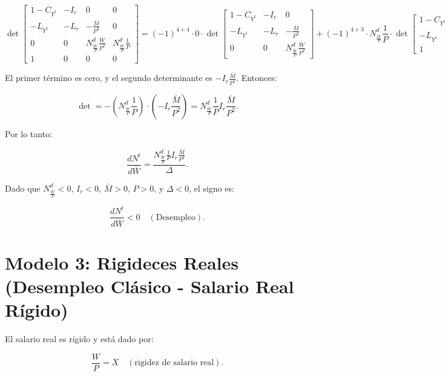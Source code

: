 \documentclass[
  doc,
  floatsintext,
  longtable,
  a4paper,
  nolmodern,
  notxfonts,
  notimes,
  colorlinks=true,linkcolor=blue,citecolor=blue,urlcolor=blue]{apa7}
\begin{document}
\begin{enumerate}
  \[
  \det \begin{bmatrix}
  1 - C_{Y^t} & -I_r & 0 & 0 \\
  -L_{Y^t} & -L_r & -\frac{\bar{M}}{P^2} & 0 \\
  0 & 0 & N^d_{\frac{\bar{W}}{P}} \frac{\bar{W}}{P^2} & N^d_{\frac{\bar{W}}{P}} \frac{1}{P} \\
  1 & 0 & 0 & 0
  \end{bmatrix} = (-1)^{4+4} \cdot 0 \cdot \det \begin{bmatrix}
  1 - C_{Y^t} & -I_r & 0 \\
  -L_{Y^t} & -L_r & -\frac{\bar{M}}{P^2} \\
  0 & 0 & N^d_{\frac{\bar{W}}{P}} \frac{\bar{W}}{P^2}
  \end{bmatrix} + (-1)^{4+3} \cdot N^d_{\frac{\bar{W}}{P}} \frac{1}{P} \cdot \det \begin{bmatrix}
  1 - C_{Y^t} & -I_r & 0 \\
  -L_{Y^t} & -L_r & -\frac{\bar{M}}{P^2} \\
  1 & 0 & 0
  \end{bmatrix}.
  \]

  El primer término es cero, y el segundo determinante es
  \(-I_r \frac{\bar{M}}{P^2}\). Entonces:

  \[
  \det = - \left( N^d_{\frac{\bar{W}}{P}} \frac{1}{P} \right) \cdot \left( -I_r \frac{\bar{M}}{P^2} \right) = N^d_{\frac{\bar{W}}{P}} \frac{1}{P} I_r \frac{\bar{M}}{P^2}.
  \]

  Por lo tanto:

  \[
  \frac{dN^t}{d\bar{W}} = \frac{N^d_{\frac{\bar{W}}{P}} \frac{1}{P} I_r \frac{\bar{M}}{P^2}}{\Delta}.
  \]

  Dado que \(N^d_{\frac{\bar{W}}{P}} < 0\), \(I_r < 0\),
  \(\bar{M} > 0\), \(P > 0\), y \(\Delta < 0\), el signo es:

  \[
  \frac{dN^t}{d\bar{W}} < 0 \quad (\text{Desempleo}).
  \]
\end{enumerate}



\section{Modelo 3: Rigideces Reales (Desempleo Clásico - Salario Real
Rígido)}\label{modelo-3-rigideces-reales-desempleo-cluxe1sico---salario-real-ruxedgido}

El salario real es rígido y está dado por:

\[
\frac{W}{P} = X \quad (\text{rigidez de salario real}).
\]
\end{document}
